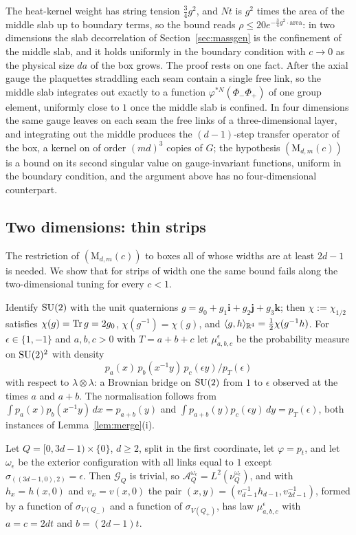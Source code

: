 The heat-kernel weight has string tension $\frac34g^2$, and $Nt$ is $g^2$ times
the area of the middle slab up to boundary terms, so the bound reads
$\rho\le20e^{-\frac34g^2\cdot\mathrm{area}}$: in two dimensions the slab
decorrelation of Section~\ref{sec:massgen} is the confinement of the middle
slab, and it holds uniformly in the boundary condition with $c\to0$ as the
physical size $da$ of the box grows. The proof rests on one fact. After the
axial gauge the plaquettes straddling each seam contain a single free link, so
the middle slab integrates out exactly to a function $\varphi^{*N}(\Phi_-\Phi_+)$
of one group element, uniformly close to $1$ once the middle slab is confined.
In four dimensions the same gauge leaves on each seam the free links of a
three-dimensional layer, and integrating out the middle produces the
$(d-1)$-step transfer operator of the box, a kernel on of order $(md)^3$ copies
of $G$; the hypothesis $(\mathrm M_{d,m}(c))$ is a bound on its second singular
value on gauge-invariant functions, uniform in the boundary condition, and the
argument above has no four-dimensional counterpart.

\subsection{Two dimensions: thin strips}\label{ssec:strips}

The restriction of $(\mathrm M_{d,m}(c))$ to boxes all of whose widths are at
least $2d-1$ is needed. We show that for strips of width one the same bound
fails along the two-dimensional tuning for every $c<1$.

Identify $\mathrm{SU}(2)$ with the unit quaternions $g=g_0+g_1\mathbf i+g_2\mathbf j+g_3
\mathbf k$; then $\chi:=\chi_{1/2}$ satisfies $\chi(g)=\operatorname{Tr} g=2g_0$, $\chi(g^{-1})
=\chi(g)$, and $\langle g,h\rangle_{\mathbb{R}^4}=\frac12\chi(g^{-1}h)$. For $\epsilon\in\{1,-1\}$
and $a,b,c>0$ with $T=a+b+c$ let $\mu^\epsilon_{a,b,c}$ be the probability
measure on $\mathrm{SU}(2)^2$ with density
\[
p_a(x)\,p_b(x^{-1}y)\,p_c(\epsilon y)/p_T(\epsilon)
\]
with respect to $\lambda\otimes\lambda$: a Brownian bridge on $\mathrm{SU}(2)$ from $1$
to $\epsilon$ observed at the times $a$ and $a+b$. The normalisation follows
from $\int p_a(x)p_b(x^{-1}y)\,dx=p_{a+b}(y)$ and $\int p_{a+b}(y)p_c(\epsilon y)
\,dy=p_T(\epsilon)$, both instances of Lemma~\ref{lem:merge}(i).

\begin{lemma}\label{lem:striplaw}
Let $Q=[0,3d-1)\times\{0\}$, $d\ge2$, split in the first coordinate, let
$\varphi=p_t$, and let $\omega_\epsilon$ be the exterior configuration with all
links equal to $1$ except $\sigma_{((3d-1,0),2)}=\epsilon$. Then $\mathcal G_Q$
is trivial, so $\mathcal A^{\omega_\epsilon}_Q=L^2(\nu^{\omega_\epsilon}_Q)$,
and with $h_x=h(x,0)$ and $v_x=v(x,0)$ the pair $(x,y)=(v_{d-1}^{-1}h_{d-1},
v_{2d-1}^{-1})$, formed by a function of $\sigma_{V(Q_-)}$ and a function of
$\sigma_{V(Q_+)}$, has law $\mu^\epsilon_{a,b,c}$ with $a=c=2dt$ and
$b=(2d-1)t$.
\end{lemma}

